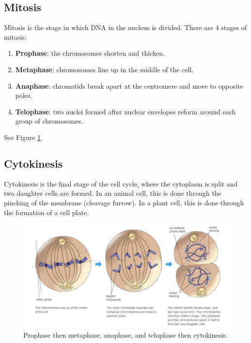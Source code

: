 \documentclass[12pt]{report}
\begin{document}
\subsection{Mitosis}\label{sec:mitosis}
\begin{definition}[Mitosis]
    Mitosis is the stage in which DNA in the nucleus is divided. There are 4 stages of mitosis:
    \begin{enumerate}
    \setlength\itemsep{0.5em}
        \item{ \textbf{Prophase}: the chromosomes shorten and thicken.}
        \item{ \textbf{Metaphase}: chromosomes line up in the middle of the cell.}
        \item{ \textbf{Anaphase}: chromatids break apart at the centromere and move to opposite poles.}
        \item{ \textbf{Telophase}: two nuclei formed after nuclear envelopes reform around each group of chromosomes.}
    \end{enumerate}
    See Figure \ref{fig:mitosis}.
\end{definition}

\subsection{Cytokinesis}
\begin{definition}[Cytokinesis]
    Cytokinesis is the final stage of the cell cycle, where the cytoplasm is split and two daughter cells are formed. In an animal cell, this is done through the pinching of the membrane (cleavage furrow). In a plant cell, this is done through the formation of a cell plate.
\end{definition}

\begin{figure}[H]
\centering
    \includegraphics[width=\textwidth]{../figures/mitosis.png}
    \caption{Prophase then metaphase, anaphase, and telophase then cytokinesis.}
    \label{fig:mitosis}
\end{figure}
\end{document}
